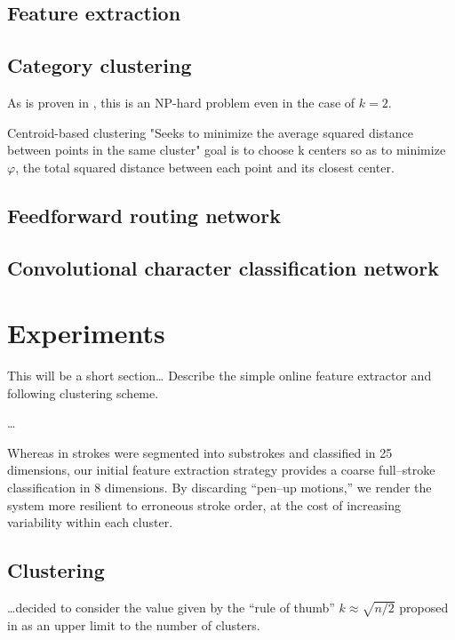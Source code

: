 \documentclass[10pt,conference,a4paper]{IEEEtran}
\begin{document}
	\subsection{Feature extraction}

	\subsection{Category clustering}

	As is proven in \cite{drineas2004clustering}, this is an NP-hard problem even in the case of $k = 2$. 

	Centroid-based clustering
	"Seeks to minimize the average squared distance between points in the same cluster"
	goal is to choose k centers so as to minimize $\varphi$, the total squared distance between each point and its closest center.

	\subsection{Feedforward routing network}

	\subsection{Convolutional character classification network}


	\section{Experiments}

	This will be a short section\ldots
	Describe the simple online feature extractor and following clustering scheme.

	\ldots

	Whereas in \cite{nakai2001substroke} strokes were segmented into substrokes and classified in
	25 dimensions, our initial feature extraction strategy provides a coarse full--stroke classification
	in 8 dimensions. By discarding ``pen--up motions,'' we render the system more resilient to erroneous
	stroke order, at the cost of increasing variability within each cluster.

	\subsection{Clustering}

	\ldots decided to consider the value given by the ``rule of thumb'' $k \approx \sqrt{n / 2}$ proposed in \cite{mardia2005multivariate}
	as an upper limit to the number of clusters.
\end{document}
